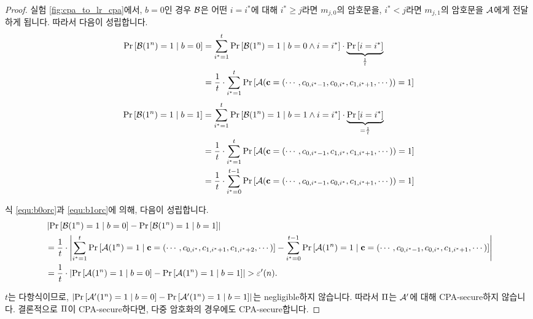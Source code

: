 \begin{proof}
  실험 \ref{fig:cpa_to_lr_cpa}에서, $b = 0$인 경우 $\mathcal{B}$은 어떤 $i = i^*$에 대해
  $i^* \ge j$라면 $m_{j, 0}$의 암호문을, $i^* < j$라면 $m_{j, 1}$의 암호문을 $\mathcal{A}$에게
  전달하게 됩니다. 따라서 다음이 성립합니다.
  \begin{equation}
    \begin{split}
      \text{Pr} \left[ \mathcal{B}(1^n) = 1 \;|\; b = 0 \right]
      &= \sum_{i^* = 1}^t \text{Pr} \left[ \mathcal{B}(1^n) = 1 \;|\; b = 0 \wedge i = i^* \right]
      \cdot \underbrace{\text{Pr} \left[ i = i^* \right]}_{\frac{1}{t}} \\
      &= \frac{1}{t} \cdot \sum_{i^* = 1}^t \text{Pr} \left[ \mathcal{A}(\mathbf{c}
        = (\cdots, c_{0, i^* - 1}, c_{0, i^*}, c_{1, i^* + 1}, \cdots)) = 1 \right]
      \label{equ:b0orc}
    \end{split}
  \end{equation}
  \begin{equation}
    \begin{split}
      \text{Pr} \left[ \mathcal{B}(1^n) = 1 \;|\; b = 1 \right]
      &= \sum_{i^* = 1}^t \text{Pr} \left[ \mathcal{B}(1^n) = 1 \;|\; b = 1 \wedge i = i^* \right]
      \cdot \underbrace{\text{Pr} \left[ i = i^* \right]}_{=\frac{1}{t}} \\
      &= \frac{1}{t} \cdot \sum_{i^* = 1}^t \text{Pr} \left[ \mathcal{A}(\mathbf{c}
        = (\cdots, c_{0, i^* - 1}, c_{1, i^*}, c_{1, i^* + 1}, \cdots)) = 1 \right] \\
      &= \frac{1}{t} \cdot \sum_{i^* = 0}^{t - 1}
      \text{Pr} \left[ \mathcal{A}(\mathbf{c}
        = (\cdots, c_{0, i^* - 1}, c_{0, i^*}, c_{1, i^* + 1}, \cdots)) = 1 \right] \\
      \label{equ:b1orc}
    \end{split}
  \end{equation}

  식 \ref{equ:b0orc}과 \ref{equ:b1orc}에 의해, 다음이 성립합니다.
  \begin{equation}
    \begin{split}
      & \left| 
        \text{Pr} \left[ \mathcal{B}(1^n) = 1 \;|\; b = 0 \right] - \text{Pr} \left[ \mathcal{B}(1^n) = 1 \;|\; b = 1 \right]
       \right| \\
      &= \frac{1}{t} \cdot \left| 
        \sum_{i^* = 1}^t \text{Pr} \left[ \mathcal{A}(1^n) = 1 \;|\; \mathbf{c}
          = (\cdots, c_{0, i^*}, c_{1, i^* + 1}, c_{1, i^* + 2}, \cdots) \right]
        - \sum_{i^* = 0}^{t-1} \text{Pr} \left[ \mathcal{A}(1^n) = 1 \;|\; \mathbf{c}
          = (\cdots, c_{0, i^* - 1}, c_{0, i^*}, c_{1, i^* + 1}, \cdots) \right]
       \right| \\
      &= \frac{1}{t} \cdot \left| \text{Pr} \left[ \mathcal{A}(1^n) = 1 \;|\; b = 0 \right]
        - \text{Pr} \left[ \mathcal{A}(1^n) = 1 \;|\; b = 1 \right] \right| > \varepsilon'(n).
    \end{split}
  \end{equation}


  $t$는 다항식이므로, $\left| \text{Pr} \left[ \mathcal{A}'(1^n) = 1 \;|\; b = 0 \right] - \text{Pr} \left[ \mathcal{A}'(1^n) = 1 \;|\; b = 1 \right] \right|$는 negligible하지 않습니다. 따라서 $\Pi$는 $\mathcal{A}'$에 대해 CPA-secure하지 않습니다. 결론적으로 $\Pi$이 CPA-secure하다면, 다중 암호화의 경우에도 CPA-secure합니다.
\end{proof}